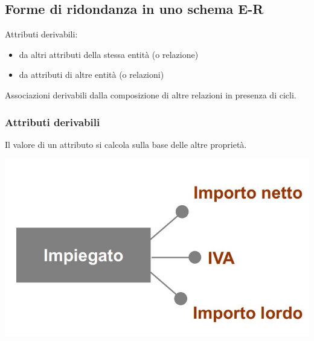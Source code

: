 \subsection{Forme di ridondanza in uno schema E-R}
Attributi derivabili:
\begin{itemize}
    \item da altri attributi della stessa entità (o relazione)
    \item da attributi di altre entità (o relazioni)
\end{itemize}
Associazioni derivabili dalla composizione di altre relazioni in presenza di cicli.

\subsubsection{Attributi derivabili}
Il valore di un attributo si calcola sulla base delle altre proprietà.
\begin{center}
    \includegraphics[scale=0.675]{chaptersLezioniSara/img/PLog_ridondanze1.jpg}
\end{center}

